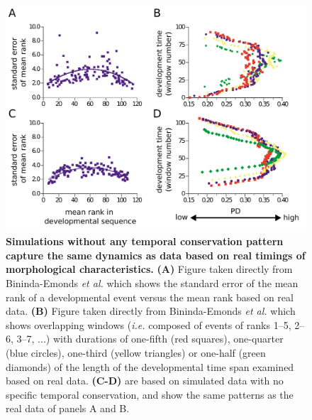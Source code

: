 \begin{figure}
    \includegraphics[width=\linewidth]{ch.inverthourglass/imgs/inverting.png}
    \caption{\textbf{Simulations without any temporal conservation pattern capture the same dynamics as data based on real timings of morphological characteristics.} \textbf{(A)} Figure taken directly from Bininda-Emonds \textit{et al.}\cite{OlafRP2003} which shows the standard error of the mean rank of a developmental event versus the mean rank based on real data. \textbf{(B)} Figure taken directly from Bininda-Emonds \textit{et al.}\cite{OlafRP2003} which shows overlapping windows (\textit{i.e.} composed of events of ranks 1–5, 2–6, 3–7, ...) with durations of one-fifth (red squares), one-quarter (blue circles), one-third (yellow triangles) or one-half (green diamonds) of the length of the developmental time span examined based on real data. \textbf{(C-D)} are based on simulated data with no specific temporal conservation, and show the same patterns as the real data of panels A and B. }
    \label{fig:inverting_inversehourglass}
\end{figure}

